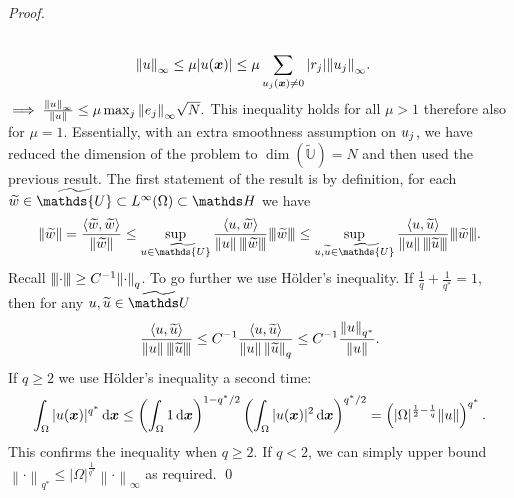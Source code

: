\documentclass[smallextended]{svjour3}
\let\F\mathds\let\C\mathcal\newcommand{\R}{\F{R}}\newcommand{\A}{\tens{A}}
\newcommand{\norm}[1]{{\left\lVert #1 \right\rVert}}
\newcommand{\Norm}[1]{{\left\vert\kern-0.25ex\left\vert\kern-0.25ex\left\vert #1 \right\vert\kern-0.25ex\right\vert\kern-0.25ex\right\vert}}
\newcommand{\IP}[2]{\left\langle #1,#2 \right\rangle}
\newcommand{\op}[1]{\operatorname{#1}}
\newcommand{\1}{\F{1}}
\newcommand{\diff}{\mathop{}\!\mathrm{d}}
\newcommand{\Domain}{\Omega}\newcommand{\domain}{\omega}
\newcommand*{\var}[1]{%
	\IfEqCase{#1}{%
		{0}{u}%
		{1}{v}%
		{2}{w}%
	}[u#1]%
}
\begin{document}
\begin{proof}
{\begin{align}
			\\\norm{\var0}_\infty \leq \mu|\var0(\vec{x})| &\leq \mu\sum_{\var0_j(\vec{x})\neq 0} |r_j|\norm{\var0_j}_\infty.
		\end{align}
		$\implies \frac{\norm{\var0}_\infty}{\norm{\var0}} \leq \mu\max_j\norm{e_j}_\infty\sqrt{N}.$
		This inequality holds for all $\mu>1$ therefore also for $\mu=1$. 
		Essentially, with an extra smoothness assumption on $\var0_j$, we have reduced the dimension of the problem to $\op{dim}(\tilde{\F{U}})=N $ and then used the previous result.
	}{%
		The first statement of the result is by definition, for each $\tilde{\var2}\in\tilde{\F{U}}\subset L^\infty(\Domain)\subset \F H$ we have
		$$ \norm{\tilde{\var2}} = \frac{\IP{\tilde{\var2}}{\tilde{\var2}}}{\norm{\tilde{\var2}}} \leq \sup_{\var0\in\tilde{\F{U}}} \frac{\IP{\var0}{\tilde{\var2}}}{\norm{\var0}\,\Norm{\tilde{\var2}}}\Norm{\tilde{\var2}} \leq \sup_{\var0,\tilde{\var0}\in\tilde{\F{U}}} \frac{\IP{\var0}{\tilde{\var0}}}{\norm{\var0}\,\Norm{\tilde{\var0}}}\Norm{\tilde{\var2}}. $$
		Recall $\Norm\cdot\geq C^{-1}\norm\cdot_q$. To go further we use H\"older's inequality. If $\frac1q+\frac{1}{q^*}=1$, then for any $\var0,\tilde{\var0}\in\tilde{\F U}$
		\begin{equation}
			\frac{\IP{\var0}{\tilde{\var0}}}{\norm{\var0}\,\Norm{\tilde{\var0}}} \leq C^{-1}\frac{\IP{\var0}{\tilde{\var0}}}{\norm{\var0}\,\norm{\tilde{\var0}}_q} 
			\leq C^{-1}\frac{\norm{\var0}_{q^*}}{\norm{\var0}}.
		\end{equation}
		If $q\geq2$ we use H\"older's inequality a second time:
		\begin{equation}
			\int_\Domain |\var0(\vec x)|^{q^*}\diff\vec{x} \leq \left(\int_\Domain 1\diff\vec{x}\right)^{1-q^*/2}\left(\int_\Domain |\var0(\vec x)|^2\diff\vec{x}\right)^{q^*/2} = \left(|\Domain|^{\frac{1}{2} -\frac{1}{q}}\norm{\var0}\right)^{q^*}.
		\end{equation}
		This confirms the inequality when $q\geq2$. If $q<2$, we can simply upper bound $\norm\cdot_{q^*}\leq |\Domain|^{\frac1{q^*}}\norm\cdot_\infty$ as required.
	}
	\qed\end{proof}
	
\end{document}
